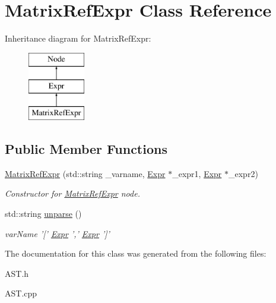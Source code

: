 \hypertarget{classMatrixRefExpr}{\section{Matrix\-Ref\-Expr Class Reference}
\label{classMatrixRefExpr}
}
Inheritance diagram for Matrix\-Ref\-Expr\-:\begin{figure}[H]
\begin{center}
\leavevmode
\includegraphics[height=3.000000cm]{classMatrixRefExpr}
\end{center}
\end{figure}
\subsection*{Public Member Functions}
\begin{DoxyCompactItemize}
\item 
\hypertarget{classMatrixRefExpr_acb6aba5d43984e83882d75f0dbcf5998}{\hyperlink{classMatrixRefExpr_acb6aba5d43984e83882d75f0dbcf5998}{Matrix\-Ref\-Expr} (std\-::string \-\_\-varname, \hyperlink{classExpr}{Expr} $\ast$\-\_\-expr1, \hyperlink{classExpr}{Expr} $\ast$\-\_\-expr2)}\label{classMatrixRefExpr_acb6aba5d43984e83882d75f0dbcf5998}

\begin{DoxyCompactList}\small\item\em Constructor for \hyperlink{classMatrixRefExpr}{Matrix\-Ref\-Expr} node. \end{DoxyCompactList}\item 
\hypertarget{classMatrixRefExpr_ac1eaeb36db1b33ea1ba6bb639ee93e04}{std\-::string \hyperlink{classMatrixRefExpr_ac1eaeb36db1b33ea1ba6bb639ee93e04}{unparse} ()}\label{classMatrixRefExpr_ac1eaeb36db1b33ea1ba6bb639ee93e04}

\begin{DoxyCompactList}\small\item\em var\-Name '\mbox{[}' \hyperlink{classExpr}{Expr} ',' \hyperlink{classExpr}{Expr} '\mbox{]}' \end{DoxyCompactList}\end{DoxyCompactItemize}


The documentation for this class was generated from the following files\-:\begin{DoxyCompactItemize}
\item 
A\-S\-T.\-h\item 
A\-S\-T.\-cpp\end{DoxyCompactItemize}
